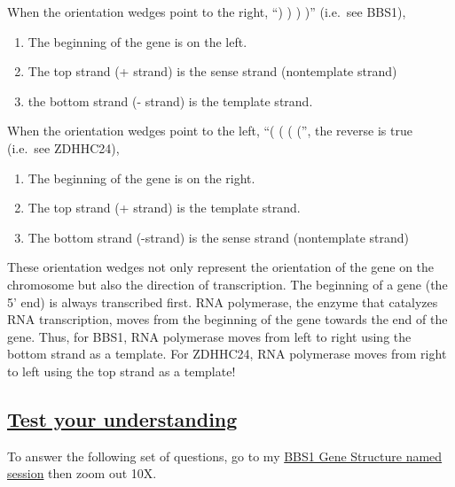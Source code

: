 \documentclass[
]{book}
\providecommand{\tightlist}{%
  \setlength{\itemsep}{0pt}\setlength{\parskip}{0pt}}
\begin{document}
When the orientation wedges point to the right, ``) ) ) )'' (i.e.~see BBS1),

\begin{enumerate}
\def\labelenumi{\arabic{enumi}.}
\tightlist
\item
  The beginning of the gene is on the left.
\item
  The top strand (+ strand) is the sense strand (nontemplate strand)
\item
  the bottom strand (- strand) is the template strand.
\end{enumerate}

When the orientation wedges point to the left, ``( ( ( ('', the reverse is true (i.e.~see ZDHHC24),

\begin{enumerate}
\def\labelenumi{\arabic{enumi}.}
\tightlist
\item
  The beginning of the gene is on the right.
\item
  The top strand (+ strand) is the template strand.
\item
  The bottom strand (-strand) is the sense strand (nontemplate strand)
\end{enumerate}

These orientation wedges not only represent the orientation of the gene on the chromosome but also the direction of transcription. The beginning of a gene (the 5' end) is always transcribed first. RNA polymerase, the enzyme that catalyzes RNA transcription, moves from the beginning of the gene towards the end of the gene. Thus, for BBS1, RNA polymerase moves from left to right using the bottom strand as a template. For ZDHHC24, RNA polymerase moves from right to left using the top strand as a template!

\hypertarget{test-your-understanding-6}{%
\subsection{\texorpdfstring{\href{https://docs.google.com/forms/d/e/1FAIpQLScgFkZWsytBOOLiaJeJi8fTler4YYHuWkDosv5gGORJIneT0w/viewform?usp=sf_link}{Test your understanding}}{Test your understanding}}\label{test-your-understanding-6}}

To answer the following set of questions, go to my \href{https://genome.ucsc.edu/s/megallegos/Biol\%20310\%20Module\%201}{BBS1 Gene Structure named session} then zoom out 10X.
\end{document}

